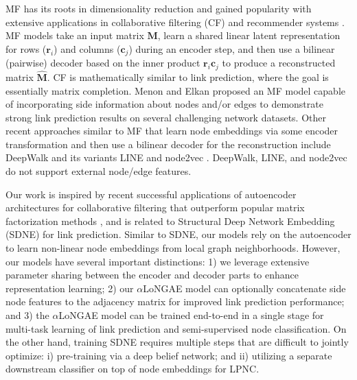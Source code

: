 \documentclass[letterpaper, conference]{IEEEtran}
\begin{document}
MF has its roots in dimensionality reduction and gained popularity with extensive applications in collaborative filtering (CF) and recommender systems \cite{Koren:2009}. MF models take an input matrix $\mathbf{M}$, learn a shared linear latent representation for rows ($\mathbf{r}_i$) and columns ($\mathbf{c}_j$) during an encoder step, and then use a bilinear (pairwise) decoder based on the inner product $\mathbf{r}_i\mathbf{c}_j$ to produce a reconstructed matrix $\mathbf{\hat{M}}$. CF is mathematically similar to link prediction, where the goal is essentially matrix completion. Menon and Elkan \cite{Menon:2011} proposed an MF model capable of incorporating side information about nodes and/or edges to demonstrate strong link prediction results on several challenging network datasets. Other recent approaches similar to MF that learn node embeddings via some encoder transformation and then use a bilinear decoder for the reconstruction include DeepWalk \cite{Perozzi:2014} and its variants LINE \cite{Tang:2015} and node2vec \cite{Grover:2016}. DeepWalk, LINE, and node2vec do not support external node/edge features.

Our work is inspired by recent successful applications of autoencoder architectures for collaborative filtering that outperform popular matrix factorization methods \cite{Sedhain:2015,Strub:2016,Kuchaiev:2017}, and is related to Structural Deep Network Embedding (SDNE) \cite{Wang:2016} for link prediction. Similar to SDNE, our models rely on the autoencoder to learn non-linear node embeddings from local graph neighborhoods. However, our models have several important distinctions: 1) we leverage extensive parameter sharing between the encoder and decoder parts to enhance representation learning; 2) our $\alpha$LoNGAE model can optionally concatenate side node features to the adjacency matrix for improved link prediction performance; and 3) the $\alpha$LoNGAE model can be trained end-to-end in a single stage for multi-task learning of link prediction and semi-supervised node classification. On the other hand, training SDNE requires multiple steps that are difficult to jointly optimize: i) pre-training via a deep belief network; and ii) utilizing a separate downstream classifier on top of node embeddings for LPNC.
\end{document}
